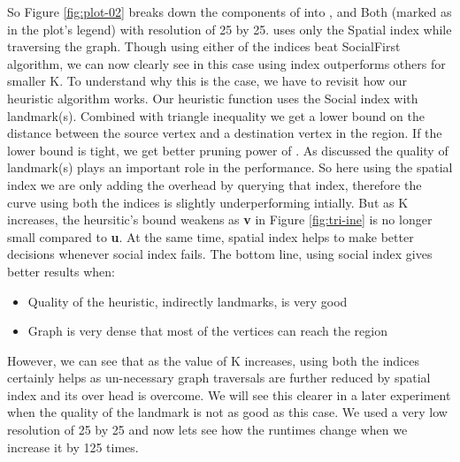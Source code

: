 So Figure \ref{fig:plot-02} breaks down the components of {\rrp} into {\rrpspatial}, {\rrpsocial} and Both (marked as {\rrp} in the plot's legend) with resolution of 25 by 25. {\rrpspatial} uses only the Spatial index while traversing the graph. Though using either of the indices beat SocialFirst algorithm, we can now clearly see in this case using {\rrpsocial} index outperforms others for smaller K. To understand why this is the case, we have to revisit how our heuristic algorithm works. Our heuristic function uses the Social index with landmark(s). Combined with triangle inequality we get a lower bound on the distance between the source vertex and a destination vertex in the region. If the lower bound is tight, we get better pruning power of {\rrp}. As discussed the quality of landmark(s) plays an important role in the performance. So here using the spatial index we are only adding the overhead by querying that index, therefore the curve using both the indices is slightly underperforming intially. But as K increases, the heursitic's bound weakens as \textbf{v} in Figure \ref{fig:tri-ine} is no longer small compared to \textbf{u}. At the same time, spatial index helps {\rrp} to make better decisions whenever social index fails. The bottom line, using social index gives better results when:
\begin{itemize}
  \item Quality of the heuristic, indirectly landmarks, is very good
  \item Graph is very dense that most of the vertices can reach the region
\end{itemize}

However, we can see that as the value of K increases, using both the indices certainly helps as un-necessary graph traversals are further reduced by spatial index and its over head is overcome. We will see this clearer in a later experiment when the quality of the landmark is not as good as this case. We used a very low resolution of 25 by 25 and now lets see how the runtimes change when we increase it by 125 times.

